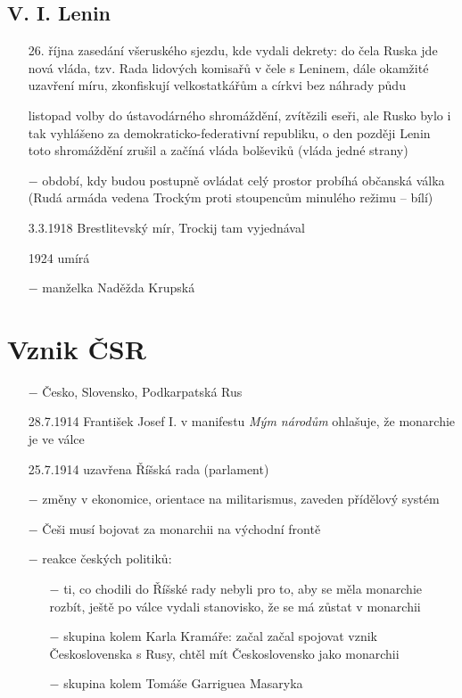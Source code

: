 \documentclass{article}
\begin{document}
\subsection*{V. I. Lenin}
\begin{itemize}
    \vspace{-0.5em}
    \setlength\itemsep{0.15em}
    \item[26. října] zasedání všeruského sjezdu, kde vydali dekrety: do čela Ruska jde nová vláda, tzv. Rada lidových komisařů v čele s Leninem, dále okamžité uzavření míru, zkonfiskují velkostatkářům a církvi bez náhrady půdu
    \item[listopad] volby do ústavodárného shromáždění, zvítězili eseři, ale Rusko bylo i tak vyhlášeno za demokraticko-federativní republiku, o den později Lenin toto shromáždění zrušil a začíná vláda bolševiků (vláda jedné strany)
    \item[$-$] období, kdy budou postupně ovládat celý prostor probíhá občanská válka (Rudá armáda vedena Trockým proti stoupencům minulého režimu -- bílí)
    \item[3.3.1918] Brestlitevský mír, Trockij tam vyjednával
    \item[1924] umírá
    \item[$-$] manželka Naděžda Krupská
\end{itemize}

\section*{Vznik ČSR}
\begin{itemize}
    \vspace{-0.5em}
    \setlength\itemsep{0.15em}
    \item[$-$] Česko, Slovensko, Podkarpatská Rus
    \item[28.7.1914] František Josef I. v manifestu \textit{Mým národům} ohlašuje, že monarchie je ve válce
    \item[25.7.1914] uzavřena Říšská rada (parlament)
    \item[$-$] změny v ekonomice, orientace na militarismus, zaveden přídělový systém
    \item[$-$] Češi musí bojovat za monarchii na východní frontě
    \item[$-$] reakce českých politiků:
    \begin{itemize}
        \vspace{-0.5em}
        \setlength\itemsep{0.15em}
        \item[$-$] ti, co chodili do Říšské rady nebyli pro to, aby se měla monarchie rozbít, ještě po válce vydali stanovisko, že se má zůstat v monarchii
        \item[$-$] skupina kolem Karla Kramáře: začal začal spojovat vznik Československa s Rusy, chtěl mít Československo jako monarchii
        \item[$-$] skupina kolem Tomáše Garriguea Masaryka
    \end{itemize}
\end{itemize}
\end{document}
